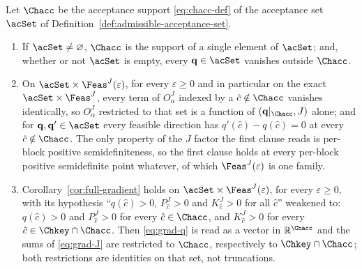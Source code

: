 \begin{lemma}\label{lem:fo-khyp}
Let $\Chacc$ be the acceptance support \eqref{eq:chacc-def} of the
acceptance set $\acSet$ of Definition~\ref{def:admissible-acceptance-set}.
\begin{enumerate}[label=(\roman*),leftmargin=2.2em]
\item If $\acSet\neq\varnothing$, $\Chacc$ is the support of a single
element of $\acSet$; and, whether or not $\acSet$ is empty, every
$\mathbf q\in\acSet$ vanishes outside $\Chacc$.
\item On $\acSet\times\Feas^{J}(\varepsilon)$, for every
$\varepsilon\ge0$ and in particular on the exact
$\acSet\times\Feas^{J}$, every term of $O^{J}_{\alpha}$ indexed by
a $\hat c\notin\Chacc$ vanishes identically, so $O^{J}_{\alpha}$ restricted
to that set is a function of $(\mathbf q|_{\Chacc},J)$ alone; and for
$\mathbf q,\mathbf q'\in\acSet$ every feasible direction has
$q'(\hat c)-q(\hat c)=0$ at every $\hat c\notin\Chacc$. The only property
of the $J$ factor the first clause reads is per-block positive
semidefiniteness, so the first clause holds at every per-block positive
semidefinite point whatever, of which $\Feas^{J}(\varepsilon)$ is one
family.
\item Corollary~\ref{cor:full-gradient} holds on
$\acSet\times\Feas^{J}(\varepsilon)$, for every $\varepsilon\ge0$,
with its hypothesis ``$q(\hat c)>0$, $P^{J}_{\hat c}>0$ and
$K^{J}_{\hat c}>0$ for all $\hat c$'' weakened to: $q(\hat c)>0$ and
$P^{J}_{\hat c}>0$ for every $\hat c\in\Chacc$, and $K^{J}_{\hat c}>0$ for
every $\hat c\in\Chkey\cap\Chacc$. Then \eqref{eq:grad-q} is read as a
vector in $\mathbb{R}^{\Chacc}$ and the sums of \eqref{eq:grad-J} are
restricted to $\Chacc$, respectively to $\Chkey\cap\Chacc$; both
restrictions are identities on that set, not truncations.
\end{enumerate}
\end{lemma}

